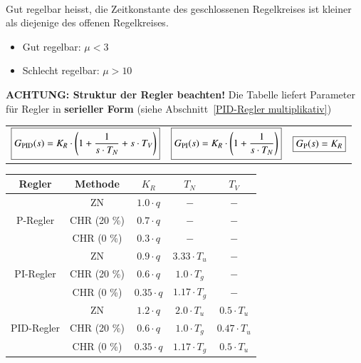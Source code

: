 \textbf{} \\
Gut regelbar heisst, die Zeitkonstante des geschlossenen Regelkreises ist kleiner als diejenige des offenen Regelkreises.

\begin{itemize}
    \item Gut regelbar: $\mu < 3$
    \item Schlecht regelbar: $\mu > 10$
\end{itemize}

\vspace{0.1cm}

\textbf{ACHTUNG: Struktur der Regler beachten!} Die Tabelle liefert Parameter für Regler in \textbf{serieller Form}
(siehe Abschnitt~\ref{PID-Regler multiplikativ}) 

\begin{tabular}{c c c }
    $ \boxed{ G_{\rm PID}(s) = K_R \cdot \Bigg( 1 + \frac{1}{s \cdot T_N} + s \cdot T_V \Bigg) }$ & 
    $ \boxed{ G_{\rm PI}(s) = K_R \cdot \Bigg( 1 + \frac{1}{s \cdot T_N} \Bigg) }$ &
    $ \boxed{ G_{\rm P}(s) = K_R }$ 
\end{tabular}

\begin{center}
    \begin{tabular}{|c | c | c | c | c|}
        \toprule
        Regler      & Methode       & $K_R$             & $T_N$                 & $T_V$             \\
        \midrule
                    & ZN            & $1.0 \cdot q$     & $-$                   & $-$               \\
        P-Regler    & CHR (20 \%)   & $0.7 \cdot q$     & $-$                   & $-$               \\
                    & CHR (0 \%)    & $0.3 \cdot q$     & $-$                   & $-$               \\
        \midrule
                    & ZN            & $0.9 \cdot q$     & $3.33 \cdot T_u$      & $-$               \\
        PI-Regler   & CHR (20 \%)   & $0.6 \cdot q$     & $1.0 \cdot T_g$       & $-$               \\
                    & CHR (0 \%)    & $0.35 \cdot q$    & $1.17 \cdot T_g$      & $-$               \\
        \midrule
                    & ZN            & $1.2 \cdot q$     & $2.0 \cdot T_u$       & $0.5 \cdot T_u$   \\
        PID-Regler  & CHR (20 \%)   & $0.6 \cdot q$     & $1.0 \cdot T_g$       & $0.47 \cdot T_u$  \\
                    & CHR (0 \%)    & $0.35 \cdot q$    & $1.17 \cdot T_g$      & $0.5 \cdot T_u$   \\
        \bottomrule
    \end{tabular}
\end{center}

